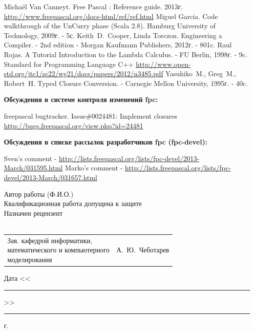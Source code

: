 \documentclass{imcs}
\begin{document}
\begin{thebibliography}{99}
 Michaël Van Canneyt. Free Pascal : Reference guide. 2013г. \url{http://www.freepascal.org/docs-html/ref/ref.html}
 Miguel Garcia. Code walkthrough of the UnCurry phase (Scala 2.8). Hamburg University of Technology, 2009г. - 5с.
 Keith~D.~Cooper, Linda Torczon. Engineering a Compiler. - 2nd edition - Morgan Kaufmann Publishers, 2012г. - 801c.
 Raul Rojas. A Tutorial Introduction to the Lambda Calculus. - FU Berlin, 1998г. - 9c.
 Standard for Programming Language C++ \url{http://www.open-std.org/jtc1/sc22/wg21/docs/papers/2012/n3485.pdf}
 Yasuhiko~M., Greg~M., Robert~H. Typed  Closure Conversion. - Carnegie Mellon University, 1995г. - 40c.

  
{\bf Обсуждения в системе контроля изменений fpc:}  
  
 freepascal bugtracker. Issue\#0024481: Implement closures \url{http://bugs.freepascal.org/view.php?id=24481}
  
{\bf Обсуждения в списке рассылок разработчиков fpc (fpc-devel):}

 Sven's comment - \url{http://lists.freepascal.org/lists/fpc-devel/2013-March/031595.html}
 Marko's comment - \url{http://lists.freepascal.org/lists/fpc-devel/2013-March/031657.html}


  
\end{thebibliography}

\pagebreak

\noindent Автор работы  (Ф.И.О.)\\

\noindent{}Квалификационная работа допущена к защите\\

\noindent{}Назначен рецензент\\
\\

\vspace{2\baselineskip}
\noindent\begin{tabular}{p{} p{}}
\parbox{8cm}{Зав. кафедрой информатики,\\ математического и компьютерного\\ моделирования} &
\hfill А.~Ю.~Чеботарев\\
\end{tabular}
\vspace{2\baselineskip}
\begin{flushright}
Дата <<\rule{1cm}{0.5pt}>>\rule{3cm}{0.5pt} г.
\end{flushright}
\end{document}
